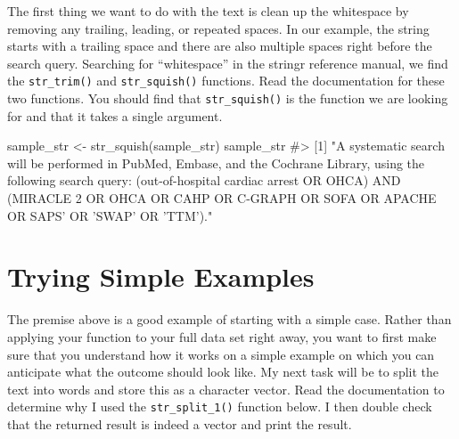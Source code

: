 \documentclass[
  letterpaper,
]{krantz}
\makeatletter
\newenvironment{Shaded}{\begin{snugshade}}{\end{snugshade}}
\newcommand{\CommentTok}[1]{\textcolor[rgb]{0.37,0.37,0.37}{#1}}
\newcommand{\FunctionTok}[1]{\textcolor[rgb]{0.28,0.35,0.67}{#1}}
\newcommand{\NormalTok}[1]{\textcolor[rgb]{0.00,0.23,0.31}{#1}}
\newcommand{\OtherTok}[1]{\textcolor[rgb]{0.00,0.23,0.31}{#1}}
\newenvironment{kframe}{%
\medskip{}
\setlength{\fboxsep}{.8em}
 \def\at@end@of@kframe{}%
 \ifinner\ifhmode%
  \def\at@end@of@kframe{\end{minipage}}%
  \begin{minipage}{\columnwidth}%
 \fi\fi%
 \def\FrameCommand##1{\hskip\@totalleftmargin \hskip-\fboxsep
 \colorbox{shadecolor}{##1}\hskip-\fboxsep
     \hskip-\linewidth \hskip-\@totalleftmargin \hskip\columnwidth}%
 \MakeFramed {\advance\hsize-\width
   \@totalleftmargin\z@ \linewidth\hsize
   \@setminipage}}%
 {\par\unskip\endMakeFramed%
 \at@end@of@kframe}
\renewenvironment{Shaded}{\begin{kframe}}{\end{kframe}}
\makeatother
\begin{document}
The first thing we want to do with the text is clean up the whitespace
by removing any trailing, leading, or repeated spaces. In our example,
the string starts with a trailing space and there are also multiple
spaces right before the search query. Searching for ``whitespace'' in
the stringr reference manual, we find the \texttt{str\_trim()} and
\texttt{str\_squish()} functions. Read the documentation for these two
functions. You should find that \texttt{str\_squish()} is the function
we are looking for and that it takes a single argument.

\begin{Shaded}
\begin{Highlighting}[]
\NormalTok{sample\_str }\OtherTok{\textless{}{-}} \FunctionTok{str\_squish}\NormalTok{(sample\_str)}
\NormalTok{sample\_str}
\CommentTok{\#\textgreater{} [1] "A systematic search will be performed in PubMed, Embase, and the Cochrane Library, using the following search query: (\textquotesingle{}out{-}of{-}hospital cardiac arrest\textquotesingle{} OR \textquotesingle{}OHCA\textquotesingle{}) AND (\textquotesingle{}MIRACLE 2\textquotesingle{} OR \textquotesingle{}OHCA\textquotesingle{} OR \textquotesingle{}CAHP\textquotesingle{} OR \textquotesingle{}C{-}GRAPH\textquotesingle{} OR \textquotesingle{}SOFA\textquotesingle{} OR \textquotesingle{}APACHE\textquotesingle{} OR \textquotesingle{}SAPS’ OR ’SWAP’ OR ’TTM’)."}
\end{Highlighting}
\end{Shaded}

\hypertarget{trying-simple-examples}{%
\section{Trying Simple Examples}\label{trying-simple-examples}}

The premise above is a good example of starting with a simple case.
Rather than applying your function to your full data set right away, you
want to first make sure that you understand how it works on a simple
example on which you can anticipate what the outcome should look like.
My next task will be to split the text into words and store this as a
character vector. Read the documentation to determine why I used the
\texttt{str\_split\_1()} function below. I then double check that the
returned result is indeed a vector and print the result.
\end{document}
